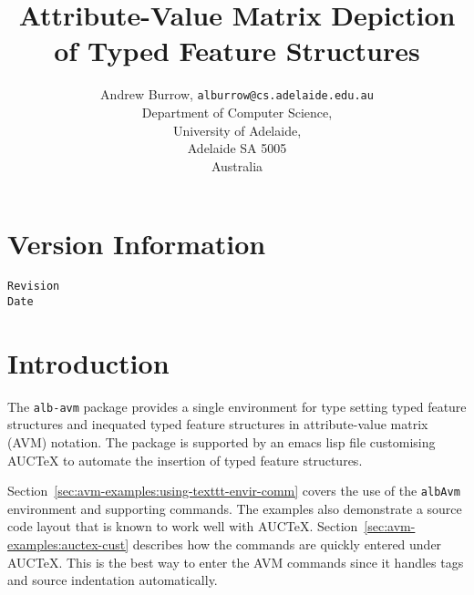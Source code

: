 \documentclass[a4paper,11pt]{article}
\newcommand{\AUCTeX}[0]{AUC\TeX{}}
\begin{document}

\title{%
  Attribute-Value Matrix Depiction of Typed Feature Structures%
  }

\author{%
  Andrew Burrow, \texttt{alburrow@cs.adelaide.edu.au}\\
  Department of Computer Science,\\
  University of Adelaide,\\
  Adelaide SA 5005\\
  Australia%
  }

\date{}

\maketitle{}





\section{Version Information}
\label{sec:avm-examples:vers-inform}

\verb$Revision$\\
\verb$Date$




\section{Introduction}
\label{sec:avm-examples:intr}

The \texttt{alb-avm} package provides a single environment for type
setting typed feature structures and inequated typed feature structures
in attribute-value matrix (AVM) notation.  The package is supported by
an emacs lisp file customising \AUCTeX{} to automate the insertion of
typed feature structures.

Section~\ref{sec:avm-examples:using-texttt-envir-comm} covers the use of
the \texttt{albAvm} environment and supporting commands.  The examples
also demonstrate a source code layout that is known to work well with
\AUCTeX{}.  Section~\ref{sec:avm-examples:auctex-cust} describes how the
commands are quickly entered under \AUCTeX{}.  This is the best way to
enter the AVM commands since it handles tags and source indentation
automatically.



\end{document}
